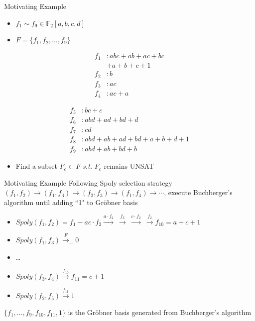 \documentclass[xcolor=dvipsnames]{beamer}
\newcommand{\bi}{\begin{itemize}}
\newcommand{\ei}{\end{itemize}}
\begin{document}
\begin{frame}{\large{Motivating Example}}
\bi
\item $f_1\sim f_9 \in \mathbb{F}_2[a,b,c,d]$
\item $F = \{f_1,f_2,\dots,f_9\}$
\ei

\begin{minipage}{2in}
\begin{align*}
f_1&: abc + ab + ac + bc \\
   & + a + b + c + 1\\
f_2&: b\\
f_3&: ac\\
f_4&: ac + a
\end{align*}
\end{minipage}
\begin{minipage}{2in}
\begin{align*}
f_5&: bc + c\\
f_6&: abd + ad + bd + d\\
f_7&: cd\\
f_8&: abd + ab + ad + bd + a + b + d + 1\\
f_9&: abd + ab +bd + b
\end{align*}
\end{minipage}
\vspace{1cm}
\bi
\item Find a subset $F_c \subset F$ {\it s.t.} $F_c$ remains UNSAT 
\ei
\end{frame}
\begin{frame}{\large{Motivating Example}}
Following Spoly selection strategy $(f_1,f_2)\to (f_1,f_3) \to (f_2,f_3)\to (f_1,f_4) \to \cdots$,
execute Buchberger's algorithm until adding ``1" to Gr\"obner basis
\bi
\item $Spoly(f_1,f_2)= f_1 - ac\cdot f_2\xrightarrow{a\cdot f_2} ~\xrightarrow{f_3}~
\xrightarrow{c\cdot f_2}  ~\xrightarrow{f_2} f_{10}=a+c+1$
\item $Spoly(f_1,f_3)\xrightarrow{F}_+ 0$
\item \dots
\item $Spoly(f_3,f_4)\xrightarrow{f_{10}} f_{11} = c+1$
\item $Spoly(f_2,f_5)\xrightarrow{f_{11}} 1$
\ei
$\{f_1,\dots,f_9,f_{10},f_{11},1\}$ is the Gr\"obner basis generated from Buchberger's algorithm
\end{frame}

\end{document}
